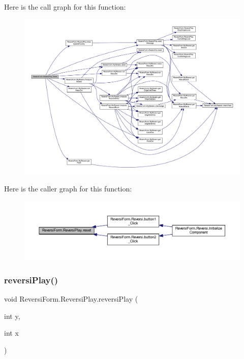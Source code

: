Here is the call graph for this function\+:
\nopagebreak
\begin{figure}[H]
\begin{center}
\leavevmode
\includegraphics[width=350pt]{class_reversi_form_1_1_reversi_play_a03997d634aa21a84e660e7f98aa27064_cgraph}
\end{center}
\end{figure}
Here is the caller graph for this function\+:
\nopagebreak
\begin{figure}[H]
\begin{center}
\leavevmode
\includegraphics[width=350pt]{class_reversi_form_1_1_reversi_play_a03997d634aa21a84e660e7f98aa27064_icgraph}
\end{center}
\end{figure}
\mbox{\label{class_reversi_form_1_1_reversi_play_a7f3822227e59fac0f998927a6566006e}} 
\subsubsection{\texorpdfstring{reversi\+Play()}{reversiPlay()}}
{\footnotesize\ttfamily void Reversi\+Form.\+Reversi\+Play.\+reversi\+Play (\begin{DoxyParamCaption}\item[{int}]{y,  }\item[{int}]{x }\end{DoxyParamCaption})}



